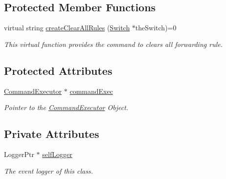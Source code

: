 \subsection*{\-Protected \-Member \-Functions}
\begin{DoxyCompactItemize}
\item 
virtual string \hyperlink{classAbstractSwitch_ad0b20ecc213f8a9740c8fdcc35e68a55}{create\-Clear\-All\-Rules} (\hyperlink{classSwitch}{\-Switch} $\ast$the\-Switch)=0
\begin{DoxyCompactList}\small\item\em \-This virtual function provides the command to clears all forwarding rule. \end{DoxyCompactList}\end{DoxyCompactItemize}
\subsection*{\-Protected \-Attributes}
\begin{DoxyCompactItemize}
\item 
\hypertarget{classAbstractSwitch_af301a644b47e434e8acf1b78e3033378}{\hyperlink{classCommandExecutor}{\-Command\-Executor} $\ast$ \hyperlink{classAbstractSwitch_af301a644b47e434e8acf1b78e3033378}{command\-Exec}}\label{classAbstractSwitch_af301a644b47e434e8acf1b78e3033378}

\begin{DoxyCompactList}\small\item\em \-Pointer to the \hyperlink{classCommandExecutor}{\-Command\-Executor} \-Object. \end{DoxyCompactList}\end{DoxyCompactItemize}
\subsection*{\-Private \-Attributes}
\begin{DoxyCompactItemize}
\item 
\hypertarget{classAbstractSwitch_af90dba876c2f828a8dc79891a7e82c09}{\-Logger\-Ptr $\ast$ \hyperlink{classAbstractSwitch_af90dba876c2f828a8dc79891a7e82c09}{self\-Logger}}\label{classAbstractSwitch_af90dba876c2f828a8dc79891a7e82c09}

\begin{DoxyCompactList}\small\item\em \-The event logger of this class. \end{DoxyCompactList}\end{DoxyCompactItemize}


